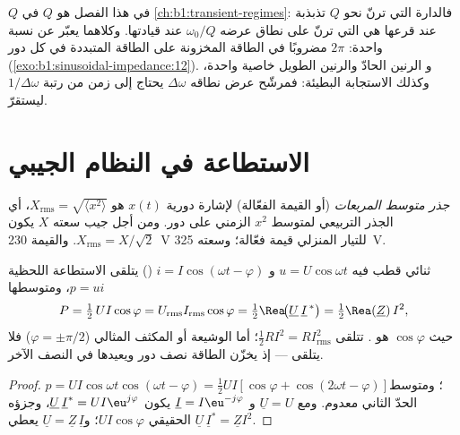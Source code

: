 \begin{remark}\label{rem:b1:sinusoidal-impedance:Q}
 $Q$ في هذا الفصل هو $Q$ في \cref{ch:b1:transient-regimes}:
فالدارة التي ترنّ نحو $Q$ تذبذبة عند قرعها هي
التي ترنّ على نطاق عرضه $\omega_0/Q$ عند قيادتها. وكلاهما
يعبّر عن نسبة واحدة: $2\pi$ مضروبًا في الطاقة المخزونة على الطاقة
المتبددة في كل دور (\cref{exo:b1:sinusoidal-impedance:12}). و
الرنين الحادّ والرنين الطويل خاصية واحدة، وكذلك
الاستجابة البطيئة: فمرشّح عرض نطاقه $\Delta\omega$ يحتاج إلى زمن من
رتبة $1/\Delta\omega$ ليستقرّ.
\end{remark}

\section{الاستطاعة في النظام الجيبي}

\begin{definition}\label{def:b1:sinusoidal-impedance:rms}
\emph{جذر متوسط المربعات} (أو القيمة الفعّالة) لإشارة
دورية $x(t)$ هو $X_{\mathrm{rms}} = \sqrt{\langle x^2\rangle}$، أي
الجذر التربيعي لمتوسط $x^2$ الزمني على دور. ومن أجل جيب
سعته $X$ يكون $X_{\mathrm{rms}} = X/\sqrt2$. والقيمة \qty{230}{V} للتيار
المنزلي قيمة فعّالة؛ وسعته \qty{325}{V}.
\end{definition}

\begin{theorem}\label{thm:b1:sinusoidal-impedance:power}
ثنائي قطب فيه $u = U\cos\omega t$ و $i = I\cos(\omega t - \varphi)$
() يتلقى الاستطاعة اللحظية $p = ui$، ومتوسطها
\[
P = \tfrac12\,UI\cos\varphi = U_{\mathrm{rms}}I_{\mathrm{rms}}\cos\varphi
= \tfrac12\Rea\!\big(\underline U\,\underline I^{\,*}\big) = \tfrac12\Rea(\underline Z)\,I^2,
\]
حيث $\cos\varphi$ هو \emph{}.  تتلقى
$\tfrac12 RI^2 = RI_{\mathrm{rms}}^2$؛ أما الوشيعة أو المكثف المثالي
($\varphi = \pm\pi/2$) فلا يتلقى  --- إذ يخزّن الطاقة
نصف دور ويعيدها في النصف الآخر.
\end{theorem}

\begin{proof}
$p = UI\cos\omega t\cos(\omega t - \varphi) = \tfrac12 UI[\cos\varphi +
\cos(2\omega t - \varphi)]$؛ ومتوسط الحدّ الثاني معدوم. ومع
$\underline U = U$ و $\underline I = I\eu^{-j\varphi}$ يكون
$\underline U\,\underline I^* = UI\eu^{j\varphi}$، وجزؤه الحقيقي
$UI\cos\varphi$؛ و$\underline U = \underline Z\,\underline I$ يعطي
$\underline U\,\underline I^* = \underline Z I^2$.
\end{proof}

